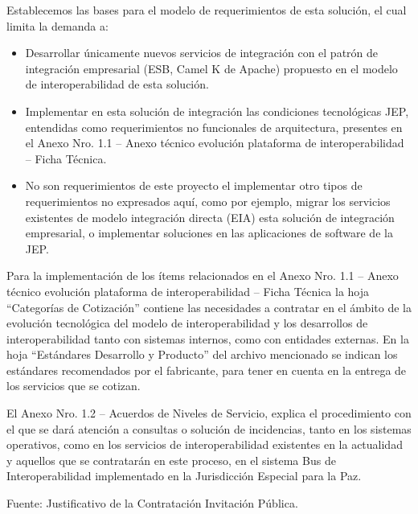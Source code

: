 \documentclass[
  paper=a4,
  ,captions=tableheading
]{scrartcl}
\providecommand{\tightlist}{%
  \setlength{\itemsep}{0pt}\setlength{\parskip}{0pt}}
\begin{document}
Establecemos las bases para el modelo de requerimientos de esta
solución, el cual limita la demanda a:

\begin{itemize}
\tightlist
\item
  Desarrollar únicamente nuevos servicios de integración con el patrón
  de integración empresarial (ESB, Camel K de Apache) propuesto en el
  modelo de interoperabilidad de esta solución.
\item
  Implementar en esta solución de integración las condiciones
  tecnológicas JEP, entendidas como requerimientos no funcionales de
  arquitectura, presentes en el Anexo Nro. 1.1 -- Anexo técnico
  evolución plataforma de interoperabilidad -- Ficha Técnica.
\item
  No son requerimientos de este proyecto el implementar otro tipos de
  requerimientos no expresados aquí, como por ejemplo, migrar los
  servicios existentes de modelo integración directa (EIA) esta solución
  de integración empresarial, o implementar soluciones en las
  aplicaciones de software de la JEP.
\end{itemize}

Para la implementación de los ítems relacionados en el Anexo Nro. 1.1 --
Anexo técnico evolución plataforma de interoperabilidad -- Ficha Técnica
la hoja ``Categorías de Cotización'' contiene las necesidades a
contratar en el ámbito de la evolución tecnológica del modelo de
interoperabilidad y los desarrollos de interoperabilidad tanto con
sistemas internos, como con entidades externas. En la hoja ``Estándares
Desarrollo y Producto'' del archivo mencionado se indican los estándares
recomendados por el fabricante, para tener en cuenta en la entrega de
los servicios que se cotizan.

El Anexo Nro. 1.2 -- Acuerdos de Niveles de Servicio, explica el
procedimiento con el que se dará atención a consultas o solución de
incidencias, tanto en los sistemas operativos, como en los servicios de
interoperabilidad existentes en la actualidad y aquellos que se
contratarán en este proceso, en el sistema Bus de Interoperabilidad
implementado en la Jurisdicción Especial para la Paz.

Fuente: Justificativo de la Contratación Invitación Pública.
\end{document}
